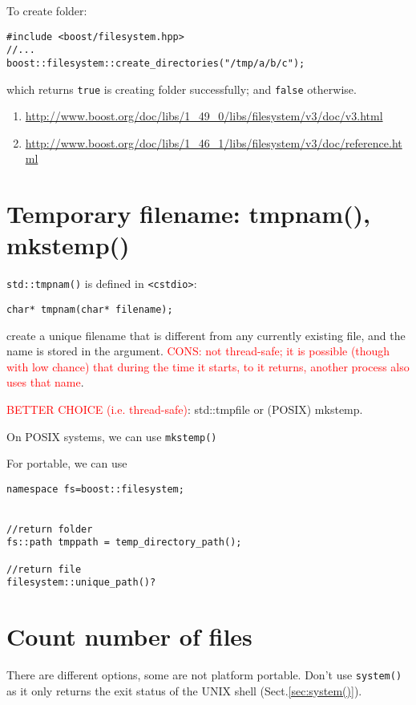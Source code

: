To create folder:
\begin{verbatim}
#include <boost/filesystem.hpp>
//...
boost::filesystem::create_directories("/tmp/a/b/c");
\end{verbatim}
which returns \verb!true! is creating folder successfully; and \verb!false!
otherwise.


\begin{enumerate}
  \item
  \url{http://www.boost.org/doc/libs/1_49_0/libs/filesystem/v3/doc/v3.html}
  
  \item
  \url{http://www.boost.org/doc/libs/1_46_1/libs/filesystem/v3/doc/reference.html}
\end{enumerate}

\section{Temporary filename: tmpnam(), mkstemp()}
\label{sec:tmpnam}
\label{sec:mkstemp}
\label{sec:tmpfile}

\verb!std::tmpnam()! is defined in \verb!<cstdio>!:
\begin{verbatim}
char* tmpnam(char* filename);
\end{verbatim}
create a unique filename that is different from any currently existing file, and
the name is stored in the argument. \textcolor{red}{CONS: not thread-safe; it is possible (though with low chance) that 
during the time it starts, to it returns, another process also uses that name}. 

\textcolor{red}{BETTER CHOICE (i.e. thread-safe)}: std::tmpfile or (POSIX) mkstemp. 


On POSIX systems, we can use \verb!mkstemp()!


For portable, we can use
\begin{verbatim}
namespace fs=boost::filesystem;


//return folder
fs::path tmppath = temp_directory_path();

//return file
filesystem::unique_path()? 

\end{verbatim}



\section{Count number of files}

There are different options, some are not platform portable.
Don't use \verb!system()! as it only returns the exit status of the UNIX shell
(Sect.\ref{sec:system()}).

